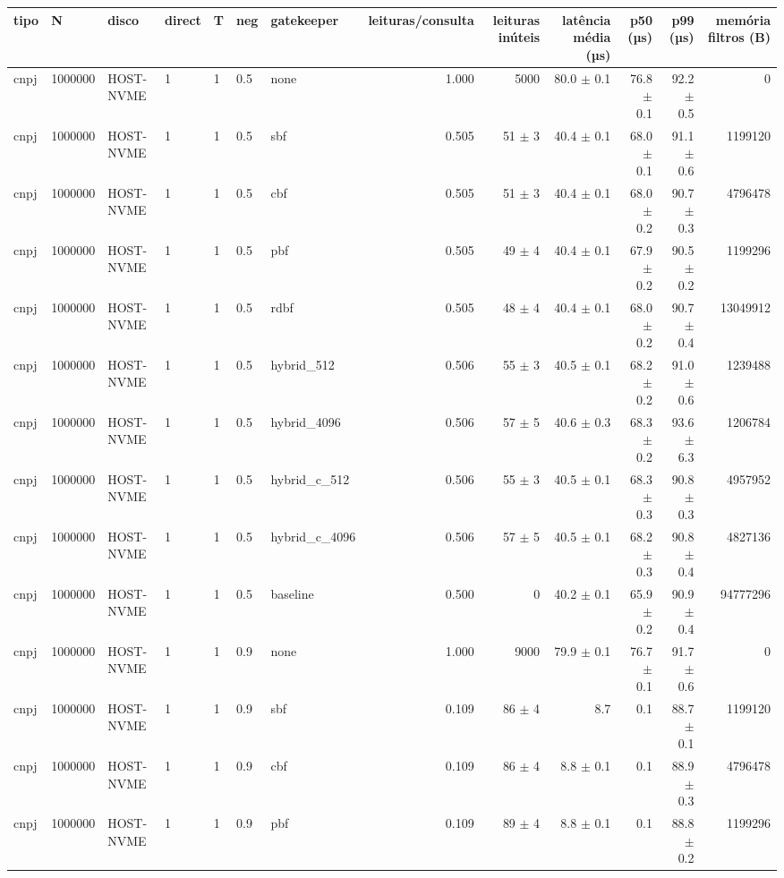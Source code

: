 \begin{tabular}{lllllllrrrrrr}
\toprule
tipo & N & disco & direct & T & neg & gatekeeper & leituras/consulta & leituras inúteis & latência média (µs) & p50 (µs) & p99 (µs) & memória filtros (B) \\
\midrule
cnpj & 1000000 & HOST-NVME & 1 & 1 & 0.5 & none & 1.000 & 5000 & 80.0 $\pm$ 0.1 & 76.8 $\pm$ 0.1 & 92.2 $\pm$ 0.5 & 0 \\
cnpj & 1000000 & HOST-NVME & 1 & 1 & 0.5 & sbf & 0.505 & 51 $\pm$ 3 & 40.4 $\pm$ 0.1 & 68.0 $\pm$ 0.1 & 91.1 $\pm$ 0.6 & 1199120 \\
cnpj & 1000000 & HOST-NVME & 1 & 1 & 0.5 & cbf & 0.505 & 51 $\pm$ 3 & 40.4 $\pm$ 0.1 & 68.0 $\pm$ 0.2 & 90.7 $\pm$ 0.3 & 4796478 \\
cnpj & 1000000 & HOST-NVME & 1 & 1 & 0.5 & pbf & 0.505 & 49 $\pm$ 4 & 40.4 $\pm$ 0.1 & 67.9 $\pm$ 0.2 & 90.5 $\pm$ 0.2 & 1199296 \\
cnpj & 1000000 & HOST-NVME & 1 & 1 & 0.5 & rdbf & 0.505 & 48 $\pm$ 4 & 40.4 $\pm$ 0.1 & 68.0 $\pm$ 0.2 & 90.7 $\pm$ 0.4 & 13049912 \\
cnpj & 1000000 & HOST-NVME & 1 & 1 & 0.5 & hybrid\_512 & 0.506 & 55 $\pm$ 3 & 40.5 $\pm$ 0.1 & 68.2 $\pm$ 0.2 & 91.0 $\pm$ 0.6 & 1239488 \\
cnpj & 1000000 & HOST-NVME & 1 & 1 & 0.5 & hybrid\_4096 & 0.506 & 57 $\pm$ 5 & 40.6 $\pm$ 0.3 & 68.3 $\pm$ 0.2 & 93.6 $\pm$ 6.3 & 1206784 \\
cnpj & 1000000 & HOST-NVME & 1 & 1 & 0.5 & hybrid\_c\_512 & 0.506 & 55 $\pm$ 3 & 40.5 $\pm$ 0.1 & 68.3 $\pm$ 0.3 & 90.8 $\pm$ 0.3 & 4957952 \\
cnpj & 1000000 & HOST-NVME & 1 & 1 & 0.5 & hybrid\_c\_4096 & 0.506 & 57 $\pm$ 5 & 40.5 $\pm$ 0.1 & 68.2 $\pm$ 0.3 & 90.8 $\pm$ 0.4 & 4827136 \\
cnpj & 1000000 & HOST-NVME & 1 & 1 & 0.5 & baseline & 0.500 & 0 & 40.2 $\pm$ 0.1 & 65.9 $\pm$ 0.2 & 90.9 $\pm$ 0.4 & 94777296 \\
cnpj & 1000000 & HOST-NVME & 1 & 1 & 0.9 & none & 1.000 & 9000 & 79.9 $\pm$ 0.1 & 76.7 $\pm$ 0.1 & 91.7 $\pm$ 0.6 & 0 \\
cnpj & 1000000 & HOST-NVME & 1 & 1 & 0.9 & sbf & 0.109 & 86 $\pm$ 4 & 8.7 & 0.1 & 88.7 $\pm$ 0.1 & 1199120 \\
cnpj & 1000000 & HOST-NVME & 1 & 1 & 0.9 & cbf & 0.109 & 86 $\pm$ 4 & 8.8 $\pm$ 0.1 & 0.1 & 88.9 $\pm$ 0.3 & 4796478 \\
cnpj & 1000000 & HOST-NVME & 1 & 1 & 0.9 & pbf & 0.109 & 89 $\pm$ 4 & 8.8 $\pm$ 0.1 & 0.1 & 88.8 $\pm$ 0.2 & 1199296 \\

\end{tabular}
